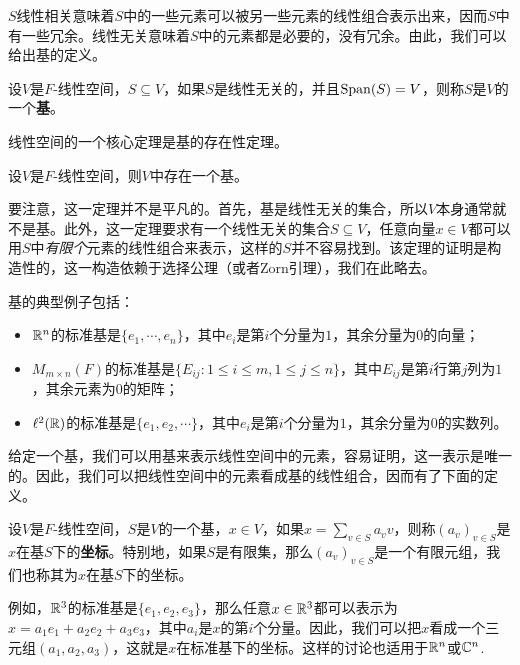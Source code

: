 $S$线性相关意味着$S$中的一些元素可以被另一些元素的线性组合表示出来，因而$S$中有一些冗余。线性无关意味着$S$中的元素都是必要的，没有冗余。由此，我们可以给出基的定义。

\begin{definition}[基]
设$V$是$F$-线性空间，$S\subseteq V$，如果$S$是线性无关的，并且$\operatorname*{Span}(S)=V$，则称$S$是$V$的一个\textbf{基}。
\end{definition}

线性空间的一个核心定理是基的存在性定理。

\begin{theorem}[基的存在性定理]\label{thm:existence-of-basis}
设$V$是$F$-线性空间，则$V$中存在一个基。
\end{theorem}

要注意，这一定理并不是平凡的。首先，基是线性无关的集合，所以$V$本身通常就不是基。此外，这一定理要求有一个线性无关的集合$S\subseteq V$，任意向量$x\in V$都可以用$S$中\emph{有限个}元素的线性组合来表示，这样的$S$并不容易找到。该定理的证明是构造性的，这一构造依赖于选择公理（或者Zorn引理），我们在此略去。

基的典型例子包括：
\begin{itemize}
    \item $\mathbb{R}^n$的标准基是$\{e_1,\cdots,e_n\}$，其中$e_i$是第$i$个分量为$1$，其余分量为$0$的向量；
    \item $M_{m\times n}(F)$的标准基是$\{E_{ij}:1\leq i\leq m,1\leq j\leq n\}$，其中$E_{ij}$是第$i$行第$j$列为$1$，其余元素为$0$的矩阵；
    \item $\ell^2(\mathbb{R})$的标准基是$\{e_1,e_2,\cdots\}$，其中$e_i$是第$i$个分量为$1$，其余分量为$0$的实数列。
\end{itemize}

给定一个基，我们可以用基来表示线性空间中的元素，容易证明，这一表示是唯一的。因此，我们可以把线性空间中的元素看成基的线性组合，因而有了下面的定义。

\begin{definition}[坐标]
设$V$是$F$-线性空间，$S$是$V$的一个基，$x\in V$，如果$x=\sum_{v\in S} a_v v$，则称$(a_v)_{v\in S}$是$x$在基$S$下的\textbf{坐标}。特别地，如果$S$是有限集，那么$(a_v)_{v\in S}$是一个有限元组，我们也称其为$x$在基$S$下的坐标。
\end{definition}

例如，$\mathbb{R}^3$的标准基是$\{e_1,e_2,e_3\}$，那么任意$x\in\mathbb{R}^3$都可以表示为$x=a_1e_1+a_2e_2+a_3e_3$，其中$a_i$是$x$的第$i$个分量。因此，我们可以把$x$看成一个三元组$(a_1,a_2,a_3)$，这就是$x$在标准基下的坐标。这样的讨论也适用于$\mathbb{R}^n$或$\mathbb{C}^n$.

